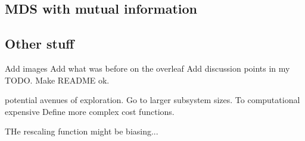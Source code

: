 \documentclass{article}
\begin{document}
\subsection{MDS with mutual information}

\subsection*{Other stuff}

Add images
Add what was before on the overleaf
Add discussion points in my TODO.
Make README ok.

potential avenues of exploration. 
Go to larger subsystem sizes. To computational expensive
Define more complex cost functions.



THe rescaling function might be biasing...
\end{document}
